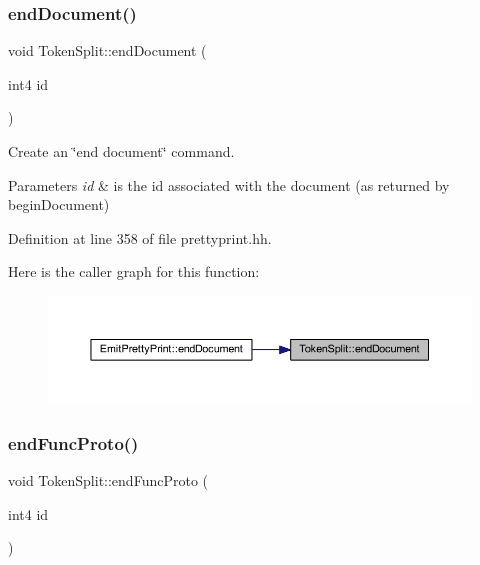 \subsubsection{\texorpdfstring{endDocument()}{endDocument()}}
{\footnotesize\ttfamily void Token\+Split\+::end\+Document (\begin{DoxyParamCaption}\item[{int4}]{id }\end{DoxyParamCaption})\hspace{0.3cm}{\ttfamily [inline]}}



Create an \char`\"{}end document\char`\"{} command. 


\begin{DoxyParams}{Parameters}
{\em id} & is the id associated with the document (as returned by begin\+Document) \\
\hline
\end{DoxyParams}


Definition at line 358 of file prettyprint.\+hh.

Here is the caller graph for this function\+:
\nopagebreak
\begin{figure}[H]
\begin{center}
\leavevmode
\includegraphics[width=350pt]{class_token_split_acf7d7054bbd3afe3c8d609484fec0e9e_icgraph}
\end{center}
\end{figure}
\mbox{\label{class_token_split_a326e6e6c122f24b053e0653c9f18ac79}} 
\subsubsection{\texorpdfstring{endFuncProto()}{endFuncProto()}}
{\footnotesize\ttfamily void Token\+Split\+::end\+Func\+Proto (\begin{DoxyParamCaption}\item[{int4}]{id }\end{DoxyParamCaption})\hspace{0.3cm}{\ttfamily [inline]}}



